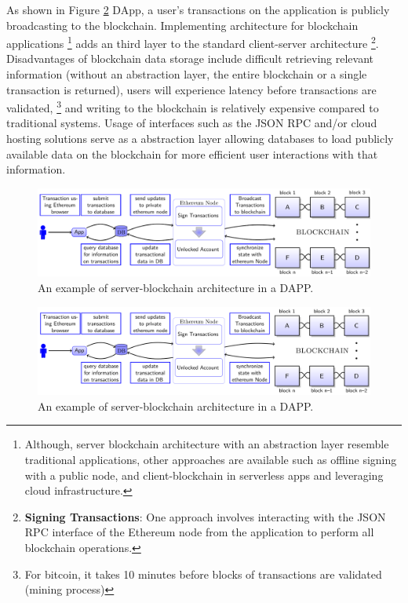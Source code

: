 As shown in 
		Figure \ref{fig:DApp} \gls{DApp}, a user's transactions on the application is publicly broadcasting to the blockchain. 
		Implementing architecture for blockchain applications \footnote{Although, server blockchain architecture with an abstraction layer resemble traditional applications, other approaches are available such as offline signing with a public node, and client-blockchain in serverless apps and leveraging cloud infrastructure.} adds an third layer to the standard client-server architecture 	\footnote{ \textbf{Signing Transactions}: One approach involves interacting with the JSON RPC interface of the \gls{Ethereum} node from the application to perform all blockchain operations.}.
		 Disadvantages of blockchain data storage include difficult retrieving relevant information (without an abstraction layer, the entire blockchain or a single transaction is returned), users will experience latency before transactions are validated, 	\footnote{For bitcoin, it takes 10 minutes before blocks of transactions are validated (mining process)} and writing to the blockchain is relatively expensive compared to traditional systems. Usage of interfaces such as the JSON RPC and/or cloud hosting 
	 solutions serve as a abstraction layer allowing databases to load publicly available data on the blockchain
	 	 for more efficient user interactions with that information. 

\begin{warpprint}
\begin{figure}[ht]
\begin{adjustbox}{center,max width=1.1\textwidth}
\includegraphics[width=1.2\linewidth]{Diagrams/blockchainInSimpleApp.pdf}
\end{adjustbox}
\caption{An example of server-blockchain architecture in a DAPP.}
\label{fig:DApp}
\end{figure}
\end{warpprint}

\begin{warpHTML}
\begin{figure}[ht]
\includegraphics[width=1.2\linewidth]{Diagrams/blockchainInSimpleApp.svg}
\caption{An example of server-blockchain architecture in a DAPP.}
\label{fig:DApp}
\end{figure}
\end{warpHTML}
